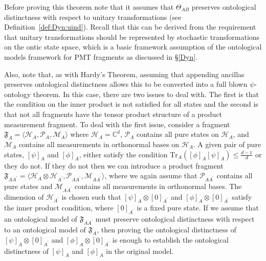 \documentclass[DIV=calc,paper=a4,fontsize=11pt,twocolumn]{scrartcl} %
\theoremstyle{definition}
\theoremstyle{plain}
\newcommand{\Proj}[1]{\ensuremath{\left [ #1 \right ]}}
\newcommand{\Hilb}[1][]{\ensuremath{\mathcal{H}_{#1}}}
\newcommand{\Tr}[2][]{\ensuremath{\text{Tr}_{#1} \left ( #2 \right )}}
\begin{document}
Before proving this theorem note that it assumes that $\Theta_{AB}$
preserves ontological distinctness with respect to unitary
transformations (see Definition~\ref{def:Dyn:uind}).  Recall that this
can be derived from the requirement that unitary transformations
should be represented by stochastic transformations on the ontic state
space, which is a basic framework assumption of the ontological models
framework for PMT fragments as discussed in \S\ref{Dyn}.

Also, note that, as with Hardy's Theorem, assuming that appending
ancillas preserves ontological distinctness allows this to be
converted into a full blown $\psi$-ontology theorem.  In this case,
there are two issues to deal with.  The first is that the condition on
the inner product is not satisfied for all states and the second is
that not all fragments have the tensor product structure of a product
measurement fragment.  To deal with the first issue, consider a
fragment $\mathfrak{F}_A = \langle \Hilb[A], \mathcal{P}_A,
\mathcal{M}_A \rangle$ where $\Hilb[A] = \mathbb{C}^d$,
$\mathcal{P}_A$ contains all pure states on $\Hilb[A]$, and
$\mathcal{M}_A$ contains all measurements in orthonormal bases on
$\Hilb[A]$.  A given pair of pure states, $\Proj{\psi}_A$ and
$\Proj{\phi}_A$, either satisfy the condition $\Tr[A]{\Proj{\phi}_A
\Proj{\psi}_A} \leq \frac{d-1}{d}$ or they do not.  If they do not
then we can introduce a product fragment $\mathfrak{F}_{AA^{\prime}} =
\langle \Hilb[A] \otimes \Hilb[A^{\prime}], \mathcal{P}_{AA^{\prime}},
\mathcal{M}_{AA^{\prime}} \rangle$, where we again assume that
$\mathcal{P}_{AA^{\prime}}$ contains all pure states and
$\mathcal{M}_{AA^{\prime}}$ contains all measurements in orthonormal
bases.  The dimension of $\Hilb[A^{\prime}]$ is chosen such that
$\Proj{\psi}_{A} \otimes \Proj{0}_{A^{\prime}}$ and $\Proj{\phi}_A
\otimes \Proj{0}_{A^{\prime}}$ satisfy the inner product condition,
where $\Proj{0}_{A^{\prime}}$ is a fixed pure state.  If we assume
that an ontological model of $\mathfrak{F}_{AA^{\prime}}$ must
preserve ontological distinctness with respect to an ontological model
of $\mathfrak{F}_A$, then proving the ontological distinctness of
$\Proj{\psi}_A \otimes \Proj{0}_{A^{\prime}}$ and $\Proj{\phi}_A
\otimes \Proj{0}_{A^{\prime}}$ is enough to establish the ontological
distinctness of $\Proj{\psi}_A$ and $\Proj{\phi}_A$ in the original
model.
\end{document}
